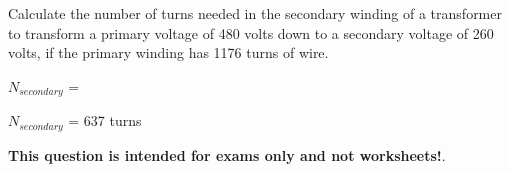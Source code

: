 

Calculate the number of turns needed in the secondary winding of a transformer to transform a primary voltage of 480 volts down to a secondary voltage of 260 volts, if the primary winding has 1176 turns of wire.

\vskip 10pt

$N_{secondary}$ =







$N_{secondary}$ = 637 turns







{\bf This question is intended for exams only and not worksheets!}.



